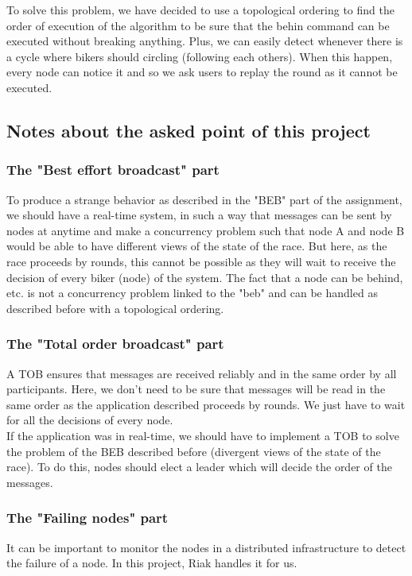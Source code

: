 \documentclass[a4paper, 11pt]{article}
\begin{document}
To solve this problem, we have decided to use a topological ordering to find the order of execution of the algorithm to be sure that the behin command can be executed without breaking anything. Plus, we can easily detect whenever there is a cycle where bikers should circling (following each others). When this happen, every node can notice it and so we ask users to replay the round as it cannot be executed. \\

\subsection{Notes about the asked point of this project}

\subsubsection{The "Best effort broadcast" part}
To produce a strange behavior as described in the "BEB" part of the assignment, we should have a real-time system, in such a way that messages can be sent by nodes at anytime and make a concurrency problem such that node A and node B would be able to have different views of the state of the race.
But here, as the race proceeds by rounds, this cannot be possible as they will wait to receive the decision of every biker (node) of the system.
The fact that a node can be behind, etc. is not a concurrency problem linked to the "beb" and can be handled as described before with a topological ordering.

\subsubsection{The "Total order broadcast" part}
A TOB ensures that messages are received reliably and in the same order by all participants.
Here, we don't need to be sure that messages will be read in the same order as the application described proceeds by rounds.
We just have to wait for all the decisions of every node. \\

If the application was in real-time, we should have to implement a TOB to solve the problem of the BEB described before (divergent views of the state of the race).
To do this, nodes should elect a leader which will decide the order of the messages.

\subsubsection{The "Failing nodes" part}
It can be important to monitor the nodes in a distributed infrastructure to detect the failure of a node.
In this project, Riak handles it for us. \\
\end{document}
